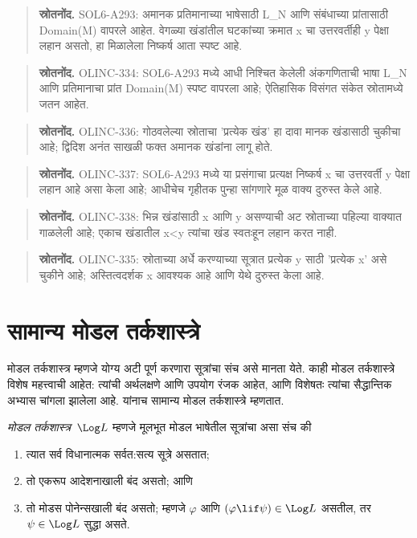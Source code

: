 \begin{quote}\small\textbf{स्रोतनोंद.} SOL6-A293: अमानक प्रतिमानाच्या भाषेसाठी L\_N आणि संबंधाच्या प्रांतासाठी Domain(M) वापरले आहेत. वेगळ्या खंडांतील घटकांच्या क्रमात x चा उत्तरवर्तीही y पेक्षा लहान असतो, हा मिळालेला निष्कर्ष आता स्पष्ट आहे.\end{quote}
\begin{quote}\small\textbf{स्रोतनोंद.} OLINC-334: SOL6-A293 मध्ये आधी निश्चित केलेली अंकगणिताची भाषा L\_N आणि प्रतिमानाचा प्रांत Domain(M) स्पष्ट वापरला आहे; ऐतिहासिक विसंगत संकेत स्रोतामध्ये जतन आहेत.\end{quote}
\begin{quote}\small\textbf{स्रोतनोंद.} OLINC-336: गोठवलेल्या स्रोताचा 'प्रत्येक खंड' हा दावा मानक खंडासाठी चुकीचा आहे; द्विदिश अनंत साखळी फक्त अमानक खंडांना लागू होते.\end{quote}
\begin{quote}\small\textbf{स्रोतनोंद.} OLINC-337: SOL6-A293 मध्ये या प्रसंगाचा प्रत्यक्ष निष्कर्ष x चा उत्तरवर्ती y पेक्षा लहान आहे असा केला आहे; आधीचेच गृहीतक पुन्हा सांगणारे मूळ वाक्य दुरुस्त केले आहे.\end{quote}
\begin{quote}\small\textbf{स्रोतनोंद.} OLINC-338: भिन्न खंडांसाठी x आणि y असण्याची अट स्रोताच्या पहिल्या वाक्यात गाळलेली आहे; एकाच खंडातील x<y त्यांचा खंड स्वतःहून लहान करत नाही.\end{quote}
\begin{quote}\small\textbf{स्रोतनोंद.} OLINC-335: स्रोताच्या अर्धे करण्याच्या सूत्रात प्रत्येक y साठी 'प्रत्येक x' असे चुकीने आहे; अस्तित्वदर्शक x आवश्यक आहे आणि येथे दुरुस्त केला आहे.\end{quote}










\section{सामान्य मोडल तर्कशास्त्रे}\label{nml:syn:nor:sec}

मोडल तर्कशास्त्र म्हणजे योग्य अटी पूर्ण करणारा
सूत्रांचा संच असे मानता येते. काही मोडल
तर्कशास्त्रे विशेष महत्त्वाची आहेत: त्यांची अर्थलक्षणे
आणि उपयोग रंजक आहेत, आणि विशेषतः त्यांचा
सैद्धान्तिक अभ्यास चांगला झालेला आहे. यांनाच
सामान्य मोडल तर्कशास्त्रे म्हणतात.

\begin{defn}\label{nml:syn:nor:defn:modal-logic}
\emph{मोडल तर्कशास्त्र}~$\Log L$ म्हणजे मूलभूत
मोडल भाषेतील सूत्रांचा असा संच की
\begin{enumerate}
\item त्यात सर्व विधानात्मक सर्वत:सत्य सूत्रे असतात;
\item तो एकरूप आदेशनाखाली बंद असतो; आणि
\item तो मोडस पोनेन्सखाली बंद असतो; म्हणजे $\varphi$ आणि
  $(\varphi \lif \psi) \in \Log L$ असतील, तर
  $\psi \in \Log L$ सुद्धा असते.
\end{enumerate}
\end{defn}


